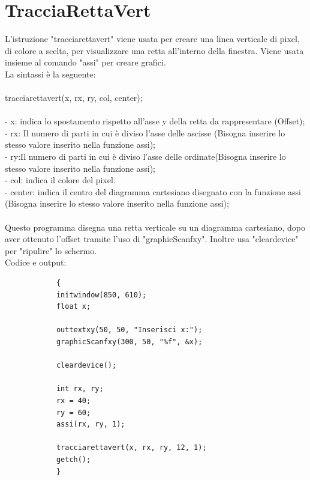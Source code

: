 \documentclass[12pt]{book}
\begin{document}
		\section{TracciaRettaVert}
		L'istruzione "tracciarettavert" viene usata per creare una linea verticale di pixel, di colore a scelta, per visualizzare una retta all'interno della finestra. Viene usata insieme al comando "assi" per creare grafici.
		\\La sintassi è la seguente:
		\\
		\\
		\Large tracciarettavert(x, rx, ry, col, center);
		\normalsize
		\\
		\\- x: indica lo spostamento rispetto all'asse y della retta da rappresentare (Offset);
		\\- rx: Il numero di parti in cui è diviso l'asse delle ascisse (Bisogna inserire lo stesso valore inserito nella funzione assi);
		\\- ry:Il numero di parti in cui è diviso l'asse delle ordinate(Bisogna inserire lo stesso valore inserito nella funzione assi);
		\\- col: indica il colore del pixel.
		\\- center: indica il centro del diagramma cartesiano disegnato con la funzione assi (Bisogna inserire lo stesso valore inserito nella funzione assi);
		\\
		\\Questo programma disegna una retta verticale su un diagramma cartesiano, dopo aver ottenuto l'offset tramite l'uso di "graphicScanfxy". Inoltre usa "cleardevice" per "ripulire" lo schermo.
		\\Codice e output:			
		\begin{lstlisting}
			{
			initwindow(850, 610);
			float x;
			
			outtextxy(50, 50, "Inserisci x:");
			graphicScanfxy(300, 50, "%f", &x);
			
			cleardevice();
			
			int rx, ry;
			rx = 40;
			ry = 60;
			assi(rx, ry, 1);
			
			tracciarettavert(x, rx, ry, 12, 1);
			getch();
			}
		\end{lstlisting}
\end{document}
